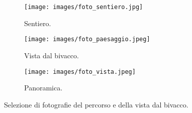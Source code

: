 \documentclass{article}
\begin{document}
\begin{figure}[htbp!]
    \centering
    \begin{subfigure}[b]{0.45\textwidth}
        \texttt{[image: images/foto\_sentiero.jpg]}
        \caption{Sentiero.}
        \label{fig:prima_foto}
    \end{subfigure}
    \hfill
    \begin{subfigure}[b]{0.45\textwidth}
        \texttt{[image: images/foto\_paesaggio.jpeg]}
        \caption{Vista dal bivacco.}
        \label{fig:seconda_foto}
    \end{subfigure}

    \vspace{1em} %
    \begin{subfigure}[b]{0.9\textwidth}
        \texttt{[image: images/foto\_vista.jpeg]}
        \caption{Panoramica.}
        \label{fig:terza_foto}
    \end{subfigure}
    \caption{Selezione di fotografie del percorso e della vista dal bivacco.}
    \label{fig:foto}
\end{figure}
\end{document}
